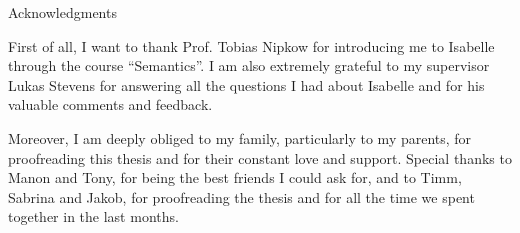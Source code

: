 \thispagestyle{empty}

\vspace*{20mm}

\begin{center}
{ Acknowledgments}
\end{center}

\vspace{10mm}

First of all, I want to thank Prof. Tobias Nipkow for introducing me to Isabelle through the course ``Semantics''.
I am also extremely grateful to my supervisor Lukas Stevens for answering all the questions I had about Isabelle and for his valuable comments and feedback.

Moreover, I am deeply obliged to my family, particularly to my parents, for proofreading this thesis and for their constant love and support.
Special thanks to Manon and Tony, for being the best friends I could ask for, and to Timm, Sabrina and Jakob, for proofreading the thesis and for all the time we spent together in the last months.





\cleardoublepage{}
